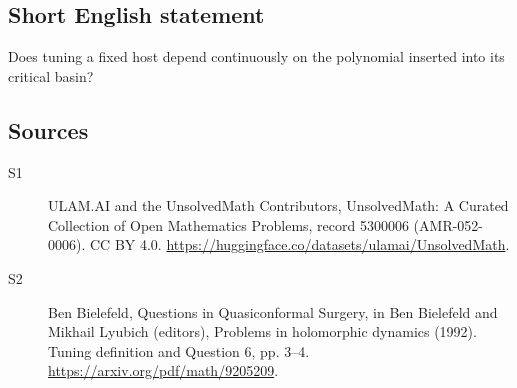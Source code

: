 \documentclass[11pt]{article}
\begin{document}
\subsection{Short English statement}
Does tuning a fixed host depend continuously on the polynomial inserted into its critical basin?
\subsection{Sources}
\begin{description}
\item[\hypertarget{source:5300006:1}{S1}] ULAM.AI and the UnsolvedMath Contributors, UnsolvedMath: A Curated Collection of Open Mathematics Problems, record 5300006 (AMR-052-0006). CC BY 4.0. \url{https://huggingface.co/datasets/ulamai/UnsolvedMath}.
\item[\hypertarget{source:5300006:2}{S2}] Ben Bielefeld, Questions in Quasiconformal Surgery, in Ben Bielefeld and Mikhail Lyubich (editors), Problems in holomorphic dynamics (1992). Tuning definition and Question 6, pp. 3–4. \url{https://arxiv.org/pdf/math/9205209}.
\end{description}
\label{end:5300006}
\end{document}
